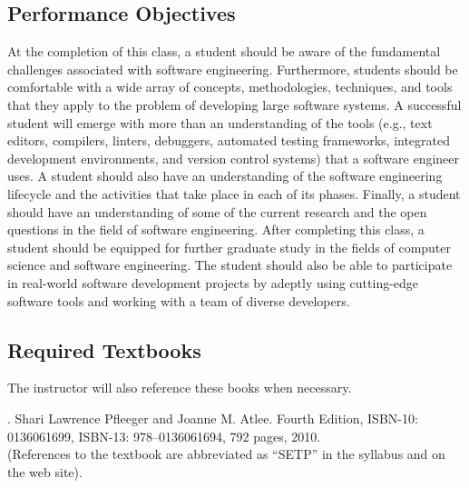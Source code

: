\documentclass[11pt]{article}
\begin{document}
\subsection*{Performance Objectives}

At the completion of this class, a student should be aware of the fundamental
challenges associated with software engineering. Furthermore, students should
be comfortable with a wide array of concepts, methodologies, techniques, and
tools that they apply to the problem of developing large software systems. A
successful student will emerge with more than an understanding of the tools
(e.g., text editors, compilers, linters, debuggers, automated testing
frameworks, integrated development environments, and version control systems)
that a software engineer uses. A student should also have an understanding of
the software engineering lifecycle and the activities that take place in each
of its phases. Finally, a student should have an understanding of some of the
current research and the open questions in the field of software engineering.
After completing this class, a student should be equipped for further graduate
study in the fields of computer science and software engineering. The student
should also be able to participate in real-world software development projects
by adeptly using cutting-edge software tools and working with a team of diverse
developers.

\subsection*{Required Textbooks}

\noindent
The instructor will also reference these books when necessary.


. Shari Lawrence Pfleeger and Joanne M. Atlee.
Fourth Edition, ISBN-10: 0136061699, ISBN-13: 978--0136061694, 792 pages, 2010. \\
(References to the textbook are abbreviated as ``SETP'' in the syllabus and on the web site).

\end{document}
